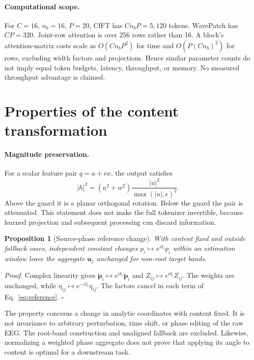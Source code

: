 \documentclass[10pt,twocolumn,letterpaper]{article}
\newtheorem{proposition}{Proposition}
\begin{document}
\paragraph{Computational scope.}
For $C=16$, $n_b=16$, $P=20$, CfFT has $Cn_bP=5{,}120$ tokens.
WavePatch has $CP=320$. Joint-row attention is over 256 rows rather
than 16. A block's attention-matrix costs scale as
$O(Cn_bP^2)$ for time and $O(P(Cn_b)^2)$ for rows, excluding width
factors and projections. Hence similar parameter counts do not imply
equal token budgets, latency, throughput, or memory. No measured
throughput advantage is claimed.

\section{Properties of the content transformation}
\label{app:properties}
\paragraph{Magnitude preservation.}
For a scalar feature pair $q=a+iw$, the output satisfies
\begin{equation}
|h|^2=(a^2+w^2)\frac{|u|^2}{\max(|u|,\epsilon)^2}.
\label{eq:norm}
\end{equation}
Above the guard it is a planar orthogonal rotation. Below the guard the
pair is attenuated. This statement does not make the full tokenizer
invertible, because learned projection and subsequent processing can
discard information.

\begin{proposition}[Source-phase reference change]
With content fixed and outside fallback cases, independent constant
changes $p_i\mapsto e^{i\delta_i}p_i$ within an estimation window leave
the aggregate $\mathbf u_j$ unchanged for non-root target bands.
\end{proposition}
\noindent\textit{Proof.}
Complex linearity gives
$\tilde{\mathbf p}_i\mapsto e^{i\delta_i}\tilde{\mathbf p}_i$ and
$Z_{ij}\mapsto e^{i\delta_i}Z_{ij}$.
The weights are unchanged, while
$\eta_{ij}\mapsto e^{-i\delta_i}\eta_{ij}$.
The factors cancel in each term of Eq.~\ref{eq:reference}. \hfill$\square$

The property concerns a change in analytic coordinates with content
fixed. It is not invariance to arbitrary perturbation, time shift,
or phase editing of the raw EEG. The root-band construction and
unaligned fallback are excluded. Likewise, normalizing a weighted
phase aggregate does not prove that applying its angle to content is
optimal for a downstream task.
\end{document}

